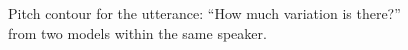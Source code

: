 \begin{figure}[!htb]
\centering
    
\caption{Pitch contour for the utterance: ``How much variation is there?'' from two models within the same speaker.}
\label{fig:pitch_variation}
\end{figure}